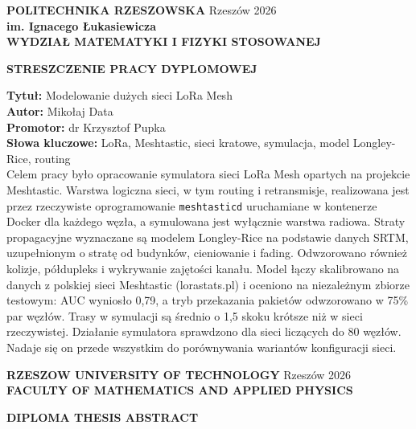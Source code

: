 \thispagestyle{empty}
\setlength{\parindent}{0in}
\setlength{\parskip}{0em}
\linespread{1.0}\selectfont

\textbf{POLITECHNIKA RZESZOWSKA} \hfill Rzeszów 2026 \\
\textbf{im. Ignacego Łukasiewicza} \\
\textbf{WYDZIAŁ MATEMATYKI I FIZYKI STOSOWANEJ} \\

\begin{center}
	\textbf{STRESZCZENIE  PRACY  DYPLOMOWEJ }
\end{center}

\textbf{Tytuł:} Modelowanie dużych sieci LoRa Mesh \\
\textbf{Autor:} Mikołaj Data \\
\textbf{Promotor:} dr Krzysztof Pupka \\
\textbf{Słowa kluczowe:} LoRa, Meshtastic, sieci kratowe, symulacja, model Longley-Rice, routing
\\

Celem pracy było opracowanie symulatora sieci LoRa Mesh opartych na projekcie Meshtastic. Warstwa logiczna sieci, w tym routing i retransmisje, realizowana jest przez rzeczywiste oprogramowanie \texttt{meshtasticd} uruchamiane w kontenerze Docker dla każdego węzła, a symulowana jest wyłącznie warstwa radiowa. Straty propagacyjne wyznaczane są modelem Longley-Rice na podstawie danych SRTM, uzupełnionym o stratę od budynków, cieniowanie i fading. Odwzorowano również kolizje, półdupleks i wykrywanie zajętości kanału. Model łączy skalibrowano na danych z polskiej sieci Meshtastic (lorastats.pl) i oceniono na niezależnym zbiorze testowym: AUC wyniosło 0,79, a tryb przekazania pakietów odwzorowano w 75\% par węzłów. Trasy w symulacji są średnio o 1,5 skoku krótsze niż w sieci rzeczywistej. Działanie symulatora sprawdzono dla sieci liczących do 80 węzłów. Nadaje się on przede wszystkim do porównywania wariantów konfiguracji sieci.


\clearpage
\thispagestyle{empty}



\textbf{RZESZOW UNIVERSITY OF TECHNOLOGY} \hfill Rzeszów 2026 \\
\textbf{FACULTY OF MATHEMATICS AND APPLIED PHYSICS } \\

\begin{center}
	\textbf{DIPLOMA THESIS ABSTRACT}
\end{center}


